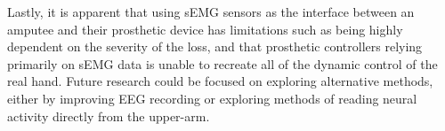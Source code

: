 \documentclass[../main.tex]{subfiles}
\begin{document}
Lastly, it is apparent that using sEMG sensors as the interface between an amputee and their prosthetic device has limitations such as being highly dependent on the severity of the loss, and that prosthetic controllers relying primarily on sEMG data is unable to recreate all of the dynamic control of the real hand.
Future research could be focused on exploring alternative methods, either by improving \gls{EEG} recording or exploring methods of reading neural activity directly from the upper-arm.

\end{document}
